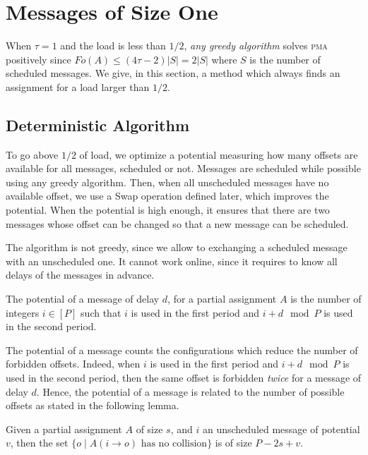 \documentclass[a4paper,cleveref, autoref, thm-restate,UKenglish]{lipics-v2019}
\newcommand\pma{\textsc{pma}\xspace}
\begin{document}
\section{Messages of Size One} \label{sec:small}

When $\tau = 1$ and the load is less than $1/2$, \emph{any greedy algorithm} solves \pma positively since $Fo(A) \leq (4\tau -2)|S| = 2|S|$ where $S$ is the number of scheduled messages. We give, in this section, a method which always finds an assignment for a load larger than $1/2$.

\subsection{Deterministic Algorithm}

To go above $1/2$ of load, we optimize a potential measuring how many offsets are available for all messages, scheduled or not. Messages are scheduled while possible using any greedy algorithm. Then, when all unscheduled messages have no available offset, we use a Swap operation defined later, which improves the potential. When the potential is high enough, it ensures that there are two messages whose offset can be changed so that a new message can be scheduled. 

The algorithm is not greedy, since we allow to exchanging a scheduled message with an unscheduled one. It cannot work online, since it requires to know all delays of the messages in advance. 

\begin{definition}
The potential of a message of delay $d$, for a partial assignment $A$
is the number of integers $i \in [P]$ such that $i$ is used in the first period and $i+d \mod P$ is used in the second period.
\end{definition}

The potential of a message counts the configurations which reduce the number of forbidden offsets.
Indeed, when $i$ is used in the first period and $i+d \mod P$ is used in the second period,
then the same offset is forbidden \emph{twice} for a message of delay $d$. Hence, the potential of a message is related to the number of possible offsets as stated in the following lemma. 

\begin{lemma}
Given a partial assignment $A$ of size $s$, and $i$ an unscheduled message of potential 
$v$, then the set $\{o \mid A(i \rightarrow o) \text{ has no collision}\}$ is of size $P - 2s + v$.
\end{lemma}
\end{document}

